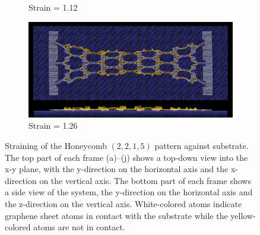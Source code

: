 \begin{figure}[H]
\begin{subfigure}[b]{0.49\textwidth}
        \caption{Strain = 1.12}
    \end{subfigure}
    \begin{subfigure}[b]{0.49\textwidth}
        \centering
        \includegraphics[width=\textwidth]{figures/baseline/contact_vs_stretch/honeycomb/hon_stretch0126.png}
        \caption{Strain = 1.26}
    \end{subfigure}
    \hfill
       \caption{Straining of the Honeycomb $(2,2,1,5)$ pattern against substrate. The top part of each frame (a)--(j) shows a top-down view into the x-y plane, with the y-direction on the horizontal axis and the x-direction on the vertical axis. The bottom part of each frame shows a side view of the system, the y-direction on the horizontal axis and the z-direction on the vertical axis. White-colored atoms indicate graphene sheet atoms in contact with the substrate while the yellow-colored atoms are not in contact.}
       \label{fig:honeycomb_strain}
  \end{figure}
  



  

